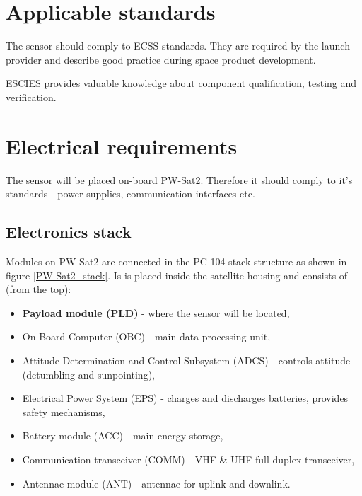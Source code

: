 \section{Applicable standards}
    The sensor should comply to ECSS \cite{ECSS_URL} standards. They are required by the launch provider and describe good practice during space product development.

    ESCIES \cite{ESCIES_URL} provides valuable knowledge about component qualification, testing and verification.

\section{Electrical requirements}
    The sensor will be placed on-board PW-Sat2. Therefore it should comply to it's standards - power supplies, communication interfaces etc.

    \subsection{Electronics stack}
        Modules on PW-Sat2 are connected in the PC-104 stack structure as shown in figure \ref{PW-Sat2_stack}. Is is placed inside the satellite housing and consists of (from the top):
        \begin{itemize}
            \item \textbf{Payload module (PLD)} - where the sensor will be located,
            \item On-Board Computer (OBC) - main data processing unit,
            \item Attitude Determination and Control Subsystem (ADCS) - controls attitude (detumbling and sunpointing),
            \item Electrical Power System (EPS) - charges and discharges batteries, provides safety mechanisms,
            \item Battery module (ACC) - main energy storage,
            \item Communication transceiver (COMM) - VHF \& UHF full duplex transceiver,
            \item Antennae module (ANT) - antennae for uplink and downlink.
        \end{itemize}

